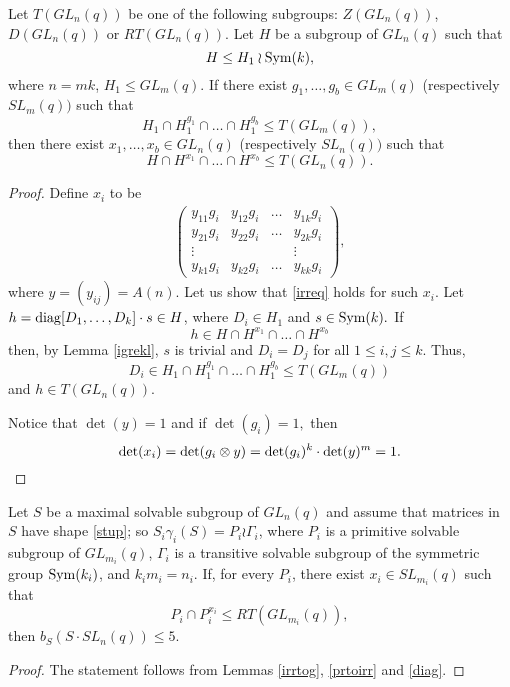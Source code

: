 \begin{Lem}\label{prtoirr}
Let $T(GL_n(q))$ be one of the following subgroups: $Z(GL_n(q))$, $D(GL_n(q))$ or $RT(GL_n(q))$. Let $H$ be a subgroup of $GL_n(q)$ such that
$$H \le H_1 \wr \mathrm{Sym}(k), $$
where $n=mk$, $H_1 \le GL_m(q)$. If there exist $g_1, \ldots, g_b \in GL_m(q)$ ({respectively } $SL_m(q))$ such that 
$$H_1 \cap H_1^{g_1} \cap \ldots \cap H_1^{g_b} \le T(GL_m(q)),$$
then there exist   $x_1, \ldots, x_b \in GL_n(q)$ ({respectively} $SL_n(q))$ such that 
\begin{equation}\label{irreq}
H \cap H^{x_1} \cap \ldots \cap H^{x_b} \le T(GL_n(q)).
\end{equation}
\end{Lem}
\begin{proof}
Define $x_i$ to be 
\begin{gather*}
\begin{pmatrix}
y_{11}g_{i}      & y_{1 2}g_{i }      & \ldots     & y_{1 k}g_{i }            \\
y_{21}g_{i}      &  y_{22}g_{i}     & \ldots     & y_{2k}g_{i}             \\
\vdots      &             &            & \vdots               \\
y_{k 1}g_{i }   & y_{k 2}g_{i}   &  \ldots    & y_{kk}g_{i}               
\end{pmatrix},
\end{gather*} 
 where $y=(y_{ij})=A(n).$ Let us show that \eqref{irreq} holds for such $x_i.$  Let  $h=\mathrm{diag}[D_1, \ldots, D_k] \cdot s  \in H$, where $D_i \in H_1$ and $s \in \mathrm{Sym}(k).$
If $$h \in H \cap H^{x_1} \cap \ldots \cap H^{x_b}$$  then, by  Lemma \ref{igrekl}, $s$ is trivial and $D_i=D_j$ for all $1 \le i, j \le {k}$. Thus, $$D_i \in H_1 \cap H_1^{g_1} \cap \ldots \cap H_1^{g_b} \le T(GL_m(q))$$
and $h \in  T(GL_n(q)).$ 

Notice that $\det(y)=1$ and if $\det(g_i)=1,$ then 
\begin{equation*}
\det(x_i)=\det(g_i \otimes y)=\det(g_i)^k \cdot \det({y})^m=1. \qedhere
\end{equation*} 
\end{proof}

\begin{Cor}
Let $S$ be a maximal solvable subgroup of $GL_n(q)$ and assume that matrices in $S$ have shape \eqref{stup}; so $S_i \gamma_i(S)= P_{i} \wr \Gamma_i$,
where $P_{i}$ is a primitive solvable subgroup of $GL_{m_i}(q)$, $\Gamma_i$ is a transitive solvable
subgroup of the symmetric group $\mathrm{Sym}(k_i)$, and $k_im_i = n_i$. If, for every $P_{i}$, there exist $x_i \in SL_{m_i}(q)$ such that
\begin{equation*}%
P_{i} \cap P_{i}^{x_i}\le RT(GL_{m_i}(q)),
\end{equation*}
then $b_S(S \cdot SL_n(q))\le5.$
\end{Cor}
\begin{proof}
The statement follows  from Lemmas \ref{irrtog},  \ref{prtoirr} and  \ref{diag}.
\end{proof}

